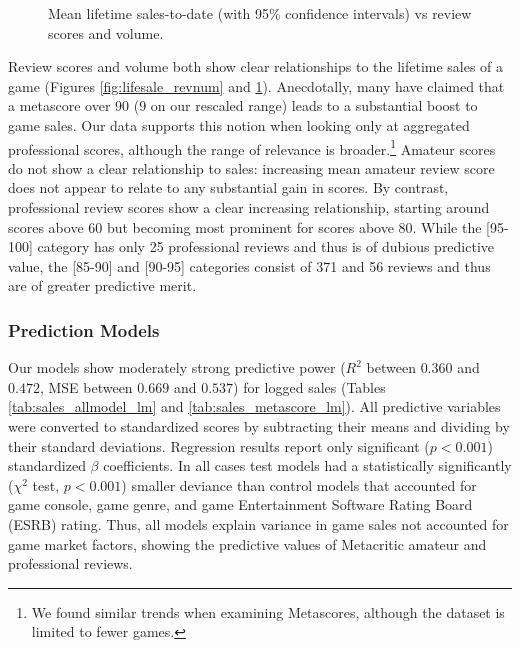 \documentclass[letterpaper]{article}
\begin{document}
\begin{figure}[tb]
\begin{subfigure}[b]{\linewidth}
\label{fig:lifesale_revscore}
\end{subfigure}

\caption{Mean lifetime sales-to-date (with 95\% confidence intervals) vs review scores and volume.}
\label{fig:lifesale_plots}
\end{figure}


Review scores and volume both show clear relationships to the lifetime sales of a game (Figures \ref{fig:lifesale_revnum} and \ref{fig:lifesale_revscore}). Anecdotally, many have claimed that a metascore over 90 (9 on our rescaled range) leads to a substantial boost to game sales. Our data supports this notion when looking only at aggregated professional scores, although the range of relevance is broader.\footnote{We found similar trends when examining Metascores, although the dataset is limited to fewer games.} Amateur scores do not show a clear relationship to sales: increasing mean amateur review score does not appear to relate to any substantial gain in scores. By contrast, professional review scores show a clear increasing relationship, starting around scores above 60 but becoming most prominent for scores above 80. While the [95-100] category has only 25 professional reviews and thus is of dubious predictive value, the [85-90] and [90-95] categories consist of 371 and 56 reviews and thus are of greater predictive merit.

\subsubsection{Prediction Models}
Our models show moderately strong predictive power ($R^2$ between $0.360$ and $0.472$, MSE between $0.669$ and $0.537$) for logged sales (Tables \ref{tab:sales_allmodel_lm} and \ref{tab:sales_metascore_lm}). All predictive variables were converted to standardized scores by subtracting their means and dividing by their standard deviations. Regression results report only significant ($p < 0.001$) standardized $\beta$ coefficients. In all cases test models had a statistically significantly ($\chi^2$ test, $p < 0.001$) smaller deviance than control models that accounted for game console, game genre, and game Entertainment Software Rating Board (ESRB) rating. Thus, all models explain variance in game sales not accounted for game market factors, showing the predictive values of Metacritic amateur and professional reviews.
\end{document}
